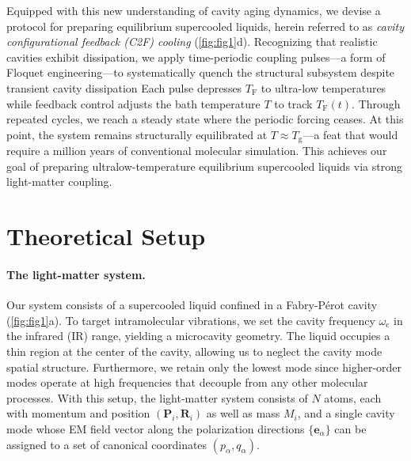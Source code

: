 \documentclass[%
 reprint,
 amsmath,amssymb,
 aps,
]{revtex4-2}
\begin{document}
Equipped with this new understanding of cavity aging dynamics, we devise a protocol for preparing equilibrium supercooled liquids, herein referred to as \textit{cavity configurational feedback (C2F) cooling} (\cref{fig:fig1}d). 
Recognizing that realistic cavities exhibit dissipation, we apply time-periodic coupling pulses---a form of Floquet engineering---to systematically quench the structural subsystem despite transient cavity dissipation
Each pulse depresses $T_\mathrm{F}$ to ultra-low temperatures while feedback control adjusts the bath temperature $T$ to track $T_\mathrm{F}(t)$.
Through repeated cycles, we reach a steady state where the periodic forcing ceases. 
At this point, the system remains structurally equilibrated at $T \approx T_\mathrm{g}$—a feat that would require a million years of conventional molecular simulation. 
This achieves our goal of preparing ultralow-temperature equilibrium supercooled liquids via strong light-matter coupling.






\section*{Theoretical Setup}

\paragraph*{The light-matter system.} 
Our system consists of a supercooled liquid confined in a Fabry-Pérot cavity (\cref{fig:fig1}a). 
To target intramolecular vibrations, we set the cavity frequency $\omega_\mathrm{c}$ in the infrared (IR) range, yielding a microcavity geometry. 
The liquid occupies a thin region at the center of the cavity, allowing us to neglect the cavity mode spatial structure. 
Furthermore, we retain only the lowest mode since higher-order modes operate at high frequencies that decouple from any other molecular processes. %
With this setup, the light-matter system consists of $N$ atoms, each with momentum and position $(\bm{P}_i,\bm{R}_i)$ as well as mass $M_i$, and a single cavity mode whose EM field vector along the polarization directions $\{\bm{e}_\alpha\}$ can be assigned to a set of canonical coordinates $(p_\alpha, q_\alpha)$. 
\end{document}
